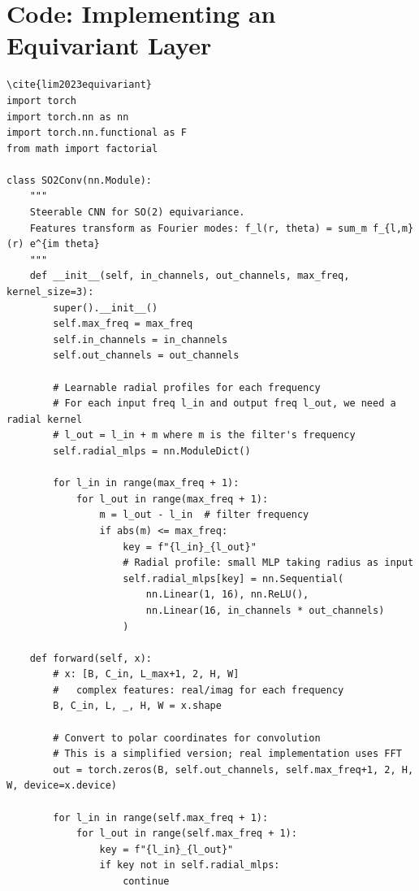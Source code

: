\section{Code: Implementing an Equivariant Layer}
\label{sec:eq:code}

\begin{lstlisting}[style=python,caption=SO(2)-equivariant convolution using steerable filters] \cite{lim2023equivariant}
import torch
import torch.nn as nn
import torch.nn.functional as F
from math import factorial

class SO2Conv(nn.Module):
    """
    Steerable CNN for SO(2) equivariance.
    Features transform as Fourier modes: f_l(r, theta) = sum_m f_{l,m}(r) e^{im theta}
    """
    def __init__(self, in_channels, out_channels, max_freq, kernel_size=3):
        super().__init__()
        self.max_freq = max_freq
        self.in_channels = in_channels
        self.out_channels = out_channels
        
        # Learnable radial profiles for each frequency
        # For each input freq l_in and output freq l_out, we need a radial kernel
        # l_out = l_in + m where m is the filter's frequency
        self.radial_mlps = nn.ModuleDict()
        
        for l_in in range(max_freq + 1):
            for l_out in range(max_freq + 1):
                m = l_out - l_in  # filter frequency
                if abs(m) <= max_freq:
                    key = f"{l_in}_{l_out}"
                    # Radial profile: small MLP taking radius as input
                    self.radial_mlps[key] = nn.Sequential(
                        nn.Linear(1, 16), nn.ReLU(),
                        nn.Linear(16, in_channels * out_channels)
                    )
    
    def forward(self, x):
        # x: [B, C_in, L_max+1, 2, H, W] 
        #   complex features: real/imag for each frequency
        B, C_in, L, _, H, W = x.shape
        
        # Convert to polar coordinates for convolution
        # This is a simplified version; real implementation uses FFT
        out = torch.zeros(B, self.out_channels, self.max_freq+1, 2, H, W, device=x.device)
        
        for l_in in range(self.max_freq + 1):
            for l_out in range(self.max_freq + 1):
                key = f"{l_in}_{l_out}"
                if key not in self.radial_mlps:
                    continue
                

\end{lstlisting}

